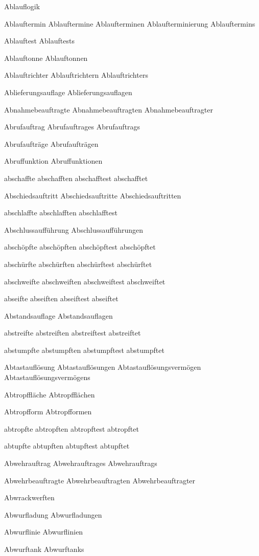 Ablauflogik

Ablauftermin
Ablauftermine
Ablaufterminen
Ablaufterminierung
Ablauftermins

Ablauftest
Ablauftests

Ablauftonne
Ablauftonnen

Ablauftrichter
Ablauftrichtern
Ablauftrichters

Ablieferungsauflage
Ablieferungsauflagen

Abnahmebeauftragte
Abnahmebeauftragten
Abnahmebeauftragter

Abrufauftrag
Abrufauftrages
Abrufauftrags

Abrufaufträge
Abrufaufträgen

Abruffunktion 
Abruffunktionen

abschaffte
abschafften
abschafftest
abschafftet

Abschiedsauftritt
Abschiedsauftritte
Abschiedsauftritten

abschlaffte
abschlafften
abschlafftest

Abschlussaufführung
Abschlussaufführungen

abschöpfte
abschöpften
abschöpftest
abschöpftet

abschürfte
abschürften
abschürftest
abschürftet

abschweifte
abschweiften
abschweiftest
abschweiftet

abseifte
abseiften
abseiftest
abseiftet

Abstandsauflage
Abstandsauflagen

abstreifte
abstreiften
abstreiftest
abstreiftet

abstumpfte
abstumpften
abstumpftest
abstumpftet

Abtastauflösung
Abtastauflösungen
Abtastauflösungsvermögen
Abtastauflösungsvermögens

Abtropffläche
Abtropfflächen

Abtropfform
Abtropfformen

abtropfte
abtropften
abtropftest
abtropftet

abtupfte
abtupften
abtupftest
abtupftet

Abwehrauftrag
Abwehrauftrages
Abwehrauftrags

Abwehrbeauftragte
Abwehrbeauftragten
Abwehrbeauftragter

Abwrackwerften

Abwurfladung
Abwurfladungen

Abwurflinie
Abwurflinien

Abwurftank
Abwurftanks


